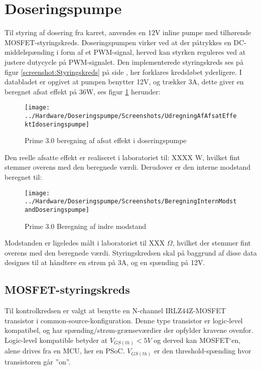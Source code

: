 
\section{Doseringspumpe}
Til styring af dosering fra karret, anvendes en 12V inline pumpe  med tilhørende MOSFET-styringskreds. 
Doseringspumpen virker ved at der påtrykkes en DC-middelspænding i form af et PWM-signal, herved kan styrken reguleres ved at justere dutycycle på PWM-signalet.
Den implementerede styringskreds ses på figur \ref{screenshot:Styringskreds} på side \pageref{screenshot:Styringskreds}, her forklares kredsløbet yderligere.
I databladet er opgivet at pumpen benytter 12V, og trækker 3A, dette giver en beregnet afsat effekt på 36W, ses figur \ref{screenshot:pumpeEffekt} herunder:

\begin{figure}[!h]
	\centering
	\texttt{[image: ../Hardware/Doseringspumpe/Screenshots/UdregningAfAfsatEffektIdoseringspumpe]}
	\caption{Prime 3.0 beregning af afsat effekt i doseringspumpe}
	\label{screenshot:pumpeEffekt}
\end{figure}

Den reelle afsatte effekt er realiseret i laboratoriet til: XXXX W, hvilket fint stemmer overens med den beregnede værdi. 
Derudover er den interne modstand beregnet til:

\begin{figure}[h]
	\centering
	\texttt{[image: ../Hardware/Doseringspumpe/Screenshots/BeregningInternModstandDoseringspumpe]}
	\caption{Prime 3.0 Beregning af indre modstand}
	\label{screenshot:pumpeModstand}
\end{figure}

Modstanden er ligeledes målt i laboratoriet til XXX $\Omega$, hvilket der stemmer fint overens med den beregnede værdi.
Styringskredsen skal på baggrund af disse data designes til at håndtere en strøm på 3A, og en spænding på 12V. 


\newpage
\subsection{MOSFET-styringskreds}
Til kontrolkredsen er valgt at benytte en N-channel IRLZ44Z-MOSFET transistor i common-source-konfiguration. Denne type transistor er logic-level kompatibel, og har spænding/strøm-grænseværdier der opfylder kravene ovenfor.  
Logic-level kompatible betyder at $ V_{GS(th)} < 5V $ og derved kan MOSFET`en, alene drives fra en MCU, her en PSoC.
$ V_{GS(th)} $ er den threshold-spænding hvor transistoren går ”on”.



